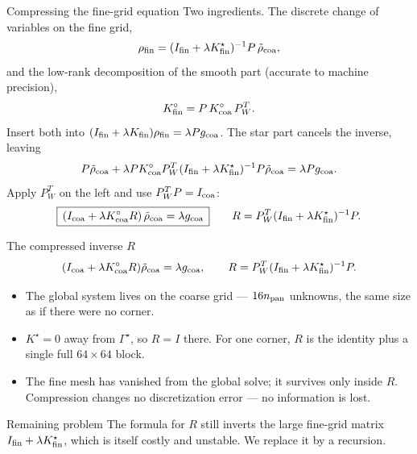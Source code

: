 \documentclass[aspectratio=169,11pt]{beamer}
\begin{document}
\begin{frame}{Compressing the fine-grid equation}
\small
Two ingredients.  The discrete change of variables on the fine grid,
\[
  \rho_{\rm fin}=(I_{\rm fin}+\lambda K^\star_{\rm fin})^{-1}P\,\tilde\rho_{\rm coa},
\]
and the low-rank decomposition of the smooth part (accurate to machine
precision),
\[
  K^\circ_{\rm fin}=P\,K^\circ_{\rm coa}\,P_W^T .
\]
Insert both into $(I_{\rm fin}+\lambda K_{\rm fin})\rho_{\rm fin}=\lambda P g_{\rm coa}$.
The star part cancels the inverse, leaving
\[
  P\tilde\rho_{\rm coa}
  +\lambda P K^\circ_{\rm coa}P_W^T(I_{\rm fin}+\lambda K^\star_{\rm fin})^{-1}P\tilde\rho_{\rm coa}
  =\lambda P g_{\rm coa}.
\]
Apply $P_W^T$ on the left and use $P_W^T P=I_{\rm coa}$:
\[
  \boxed{\,(I_{\rm coa}+\lambda K^\circ_{\rm coa}R)\,\tilde\rho_{\rm coa}=\lambda g_{\rm coa}\,}
  \qquad
  R=P_W^T(I_{\rm fin}+\lambda K^\star_{\rm fin})^{-1}P .
\]
\end{frame}

\begin{frame}{The compressed inverse $R$}
\small
\[
  (I_{\rm coa}+\lambda K^\circ_{\rm coa}R)\tilde\rho_{\rm coa}=\lambda g_{\rm coa},
  \qquad
  R=P_W^T(I_{\rm fin}+\lambda K^\star_{\rm fin})^{-1}P .
\]
\begin{itemize}
  \item The global system lives on the coarse grid --- $16 n_{\rm pan}$
  unknowns, the same size as if there were no corner.
  \item $K^\star=0$ away from $\Gamma^\star$, so $R=I$ there.  For one corner,
  $R$ is the identity plus a single full $64\times64$ block.
  \item The fine mesh has vanished from the global solve; it survives only inside
  $R$.  Compression changes no discretization error --- no information is lost.
\end{itemize}
\begin{block}{Remaining problem}
The formula for $R$ still inverts the large fine-grid matrix
$I_{\rm fin}+\lambda K^\star_{\rm fin}$, which is itself costly and unstable.  We
replace it by a recursion.
\end{block}
\end{frame}
\end{document}
